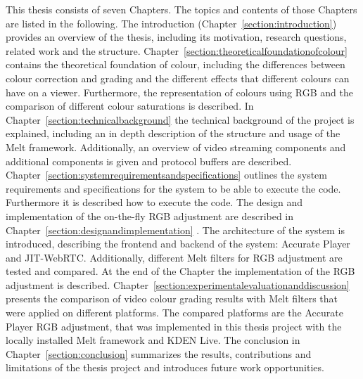 \documentclass[../MasterThesis.tex]{subfiles}
\begin{document}
	This thesis consists of seven Chapters. The topics and contents of those Chapters are listed in the following.
	The introduction (Chapter~\ref{section:introduction}) provides an overview of the thesis, including its motivation, research questions, related work and the structure.
	Chapter~\ref{section:theoreticalfoundationofcolour} contains the theoretical foundation of colour, including the differences between colour correction and grading and the different effects that different colours can have on a viewer. Furthermore, the representation of colours using RGB and the comparison of different colour saturations is described.
	In Chapter~\ref{section:technicalbackground} the technical background of the project is explained, including an in depth description of the structure and usage of the Melt framework. Additionally, an overview of video streaming components and additional components is given and protocol buffers are described.
	Chapter~\ref{section:systemrequirementsandspecifications} outlines the system requirements and specifications for the system to be able to execute the code. Furthermore it is described how to execute the code.
	The design and implementation of the on-the-fly RGB adjustment are described in Chapter~\ref{section:designandimplementation} . The architecture of the system is introduced, describing the frontend and backend of the system: Accurate Player and JIT-WebRTC. Additionally, different Melt filters for RGB adjustment are tested and compared. At the end of the Chapter the implementation of the RGB adjustment is described.
	Chapter~\ref{section:experimentalevaluationanddiscussion} presents the comparison of video colour grading results with Melt filters that were applied on different platforms. The compared platforms are the Accurate Player RGB adjustment, that was implemented in this thesis project with the locally installed Melt framework and KDEN Live.
	The conclusion in Chapter~\ref{section:conclusion} summarizes the results, contributions and limitations of the thesis project and introduces future work opportunities.
		

	
	
	

	
	

	
	
	
\end{document}
